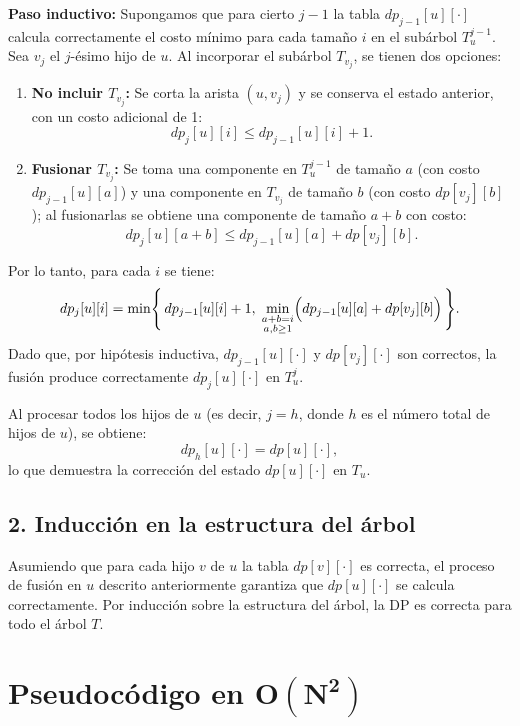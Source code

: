\documentclass[12pt]{article}
\begin{document}
\textbf{Paso inductivo:}  
Supongamos que para cierto \(j-1\) la tabla \(dp_{j-1}[u][\cdot]\) calcula correctamente el costo mínimo para cada tamaño \(i\) en el subárbol \(T_u^{j-1}\). Sea \(v_j\) el \(j\)-ésimo hijo de \(u\). Al incorporar el subárbol \(T_{v_j}\), se tienen dos opciones:
\begin{enumerate}
    \item \textbf{No incluir \(T_{v_j}\):}  
    Se corta la arista \((u,v_j)\) y se conserva el estado anterior, con un costo adicional de 1:
    \[
    dp_j[u][i] \le dp_{j-1}[u][i] + 1.
    \]
    \item \textbf{Fusionar \(T_{v_j}\):}  
    Se toma una componente en \(T_u^{j-1}\) de tamaño \(a\) (con costo \(dp_{j-1}[u][a]\)) y una componente en \(T_{v_j}\) de tamaño \(b\) (con costo \(dp[v_j][b]\)); al fusionarlas se obtiene una componente de tamaño \(a+b\) con costo:
    \[
    dp_j[u][a+b] \le dp_{j-1}[u][a] + dp[v_j][b].
    \]
\end{enumerate}

Por lo tanto, para cada \(i\) se tiene:
\[
dp_j[u][i] = \min \Biggl\{\, dp_{j-1}[u][i] + 1,\; \min_{\substack{a+b=i \\ a,b\ge1}} \Bigl( dp_{j-1}[u][a] + dp[v_j][b] \Bigr) \,\Biggr\}.
\]
Dado que, por hipótesis inductiva, \(dp_{j-1}[u][\cdot]\) y \(dp[v_j][\cdot]\) son correctos, la fusión produce correctamente \(dp_j[u][\cdot]\) en \(T_u^j\).

Al procesar todos los hijos de \(u\) (es decir, \(j=h\), donde \(h\) es el número total de hijos de \(u\)), se obtiene:
\[
dp_h[u][\cdot] = dp[u][\cdot],
\]
lo que demuestra la corrección del estado \(dp[u][\cdot]\) en \(T_u\).

\subsection*{2. Inducción en la estructura del árbol}

Asumiendo que para cada hijo \(v\) de \(u\) la tabla \(dp[v][\cdot]\) es correcta, el proceso de fusión en \(u\) descrito anteriormente garantiza que \(dp[u][\cdot]\) se calcula correctamente. Por inducción sobre la estructura del árbol, la DP es correcta para todo el árbol \(T\).

\bigskip

\section{Pseudocódigo en \(\boldsymbol{O(N^2)}\)}
\end{document}
